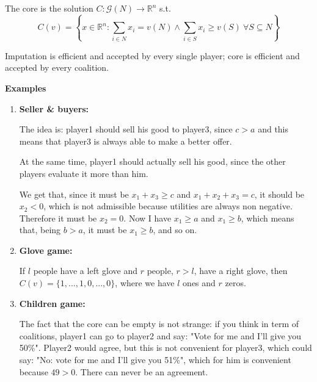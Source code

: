 \noindent The core is the solution $C: \mathcal{G}(N) \rightarrow \mathbb{R}^n$ s.t.
\[
	C(v) = \left\{ x \in \mathbb{R}^n: \sum_{i\in N}{x_i} = v(N) 
	\wedge \sum_{i\in S}{x_i} \geq v(S) ~ \forall S \subseteq N \right\}
\]

\noindent Imputation is efficient and accepted by every single player; core 
is efficient and accepted by every coalition.

\bigskip
\noindent \textbf {Examples}
\begin{enumerate}

	\item \textbf{Seller \& buyers:}
	
	\noindent The idea is: player1 should sell his good to player3, since $c>a$ 
	and this means that player3 is always able to make a better offer.
	
	\noindent At the same time, player1 should actually sell his good, since the 
	other players evaluate it more than him.
	
	\noindent We get that, since it must be $x_1+x_3\geq c$ and $x_1+x_2+x_3=c$, 
	it should be $x_2<0$, which is not admissible because utilities are always 
	non negative. Therefore it must be $x_2=0$. Now I have $x_1\geq a$ and 
	$x_1 \geq b$, which means that, being $b>a$, it must be $x_1\geq b$, and 
	so on.

	\item \textbf{Glove game:}
	
	\noindent If $l$ people have a left glove and $r$ people, $r > l$, have a right glove, then $C(v) = \{1,...,1,0,...,0\}$, where we have $l$ ones and $r$ zeros.
	
	\item \textbf{Children game:}
	
	\noindent The fact that the core can be empty is not strange: if you think 
	in term of coalitions, player1 can go to player2 and say: "Vote for me and 
	I'll give you 50\%". Player2 would agree, but this is not convenient for 
	player3, which could say: "No: vote for me and I'll give you 51\%", which 
	for him is convenient because $49>0$. There can never be an agreement.
	
\end{enumerate}

%
